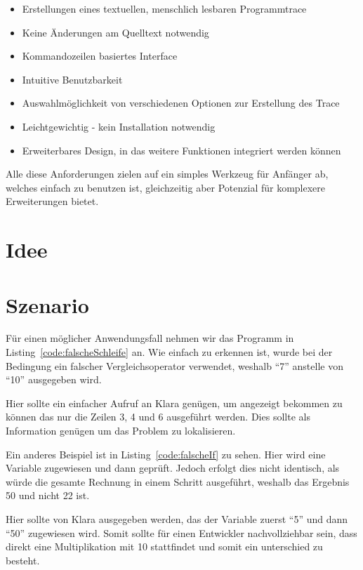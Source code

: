 \begin{itemize}
	\item Erstellungen eines textuellen, menschlich lesbaren Programmtrace
	\item Keine Änderungen am Quelltext notwendig
	\item Kommandozeilen basiertes Interface
	\item Intuitive Benutzbarkeit
	\item Auswahlmöglichkeit von verschiedenen Optionen zur Erstellung des Trace
	\item Leichtgewichtig - kein Installation notwendig
	\item Erweiterbares Design, in das weitere Funktionen integriert werden können
\end{itemize}

Alle diese Anforderungen zielen auf ein simples Werkzeug für Anfänger ab, welches einfach zu benutzen ist, gleichzeitig aber Potenzial für komplexere Erweiterungen bietet.

\section{Idee} 



\section{Szenario} 

Für einen möglicher Anwendungsfall nehmen wir das Programm in Listing~\ref{code:falscheSchleife} an. Wie einfach zu erkennen ist, wurde bei der Bedingung ein falscher Vergleichsoperator verwendet, weshalb "`7"' anstelle von "`10"' ausgegeben wird.



Hier sollte ein einfacher Aufruf an Klara genügen, um angezeigt bekommen zu können das nur die Zeilen 3, 4 und 6 ausgeführt werden. Dies sollte als Information genügen um das Problem zu lokalisieren.

Ein anderes Beispiel ist in Listing~\ref{code:falscheIf} zu sehen. Hier wird eine Variable zugewiesen und dann geprüft. Jedoch erfolgt dies nicht identisch, als würde die gesamte Rechnung in einem Schritt ausgeführt, weshalb das Ergebnis 50 und nicht 22 ist.



Hier sollte von Klara ausgegeben werden, das der Variable  zuerst "`5"' und dann "`50"' zugewiesen wird. Somit sollte für einen Entwickler nachvollziehbar sein, dass direkt eine Multiplikation mit 10 stattfindet und somit ein unterschied zu  besteht.